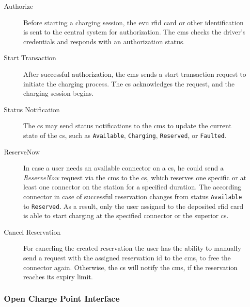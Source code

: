 \begin{description}
    \item[Authorize] Before starting a charging session, the \acrshort{evu} \acrfull{rfid} card or other identification is sent to the central system for authorization. The \acrshort{cms} checks the driver's credentials and responds with an authorization status.
    \item[Start Transaction] After successful authorization, the \acrshort{cms} sends a start transaction request to initiate the charging process. The \acrshort{cs} acknowledges the request, and the charging session begins.
    \item[Status Notification] The \acrshort{cs} may send status notifications to the \acrshort{cms} to update the current state of the \acrshort{cs}, such as \verb|Available|, \verb|Charging|, \verb|Reserved|, or \verb|Faulted|.
    \item[ReserveNow] In case a user needs an available connector on a \acrshort{cs}, he could send a \textit{ReserveNow} request via the \acrshort{cms} to the \acrshort{cs}, which reserves one specific or at least one connector on the station for a specified duration. The according connector in case of successful reservation changes from status \verb|Available| to \verb|Reserved|.
    As a result, only the user assigned to the deposited \acrshort{rfid} card is able to start charging at the specified connector or the superior \acrshort{cs}.
    \item[Cancel Reservation] For canceling the created reservation the user has the ability to manually send a request with the assigned reservation \acrshort{id} to the \acrshort{cms}, to free the connector again. Otherwise, the \acrshort{cs} will notify the \acrshort{cms}, if the reservation reaches its expiry limit.
\end{description}

\subsubsection{Open Charge Point Interface}
\label{ch:Fundamentals:sec:Electric Mobility:ssec:Relevant Standards:sssec:OCPI}

